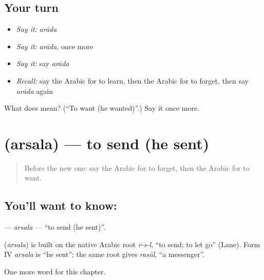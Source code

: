 \subsection*{Your turn}
\begin{itemize}
\raggedright
  \item \emph{Say it:} \emph{arāda}
  \item \emph{Say it:} \emph{arāda}, once more
  \item \emph{Say it:} say \emph{arāda}
  \item \emph{Recall:} say the Arabic for to learn, then the Arabic for to forget, then say \emph{arāda} again
\end{itemize}

\begin{tcolorbox}[breakable,colback=teal!4,colframe=teal!35!black,title={Before you move on}]
What does  mean? (\textquotedblleft{}To want (he wanted)\textquotedblright{}.) Say it once more.
\end{tcolorbox}
\section[\texorpdfstring{\ar{أرسل} (arsala)}{أرسل (arsala)}]{ (arsala) — to send (he sent)}

\label{lesson:AR-C61-arsala}



\begin{quote}
Before the new one: say the Arabic for to forget, then the Arabic for to want.
\end{quote}

\subsection*{You'll want to know: }
\textbf{} — \emph{arsala} — \textquotedblleft{}to send (he sent)\textquotedblright{}.

\begin{cousinweb}
\textbf{} (\emph{arsala}) is built on the native Arabic root \emph{r-s-l}, \textquotedblleft{}to send; to let go\textquotedblright{} (Lane). Form IV \emph{arsala} is \textquotedblleft{}he sent\textquotedblright{}; the same root gives \emph{rasūl}, \textquotedblleft{}a messenger\textquotedblright{}.
\end{cousinweb}

\begin{grammarlens}[title={What you've built}]
One more word for this chapter.
\end{grammarlens}

